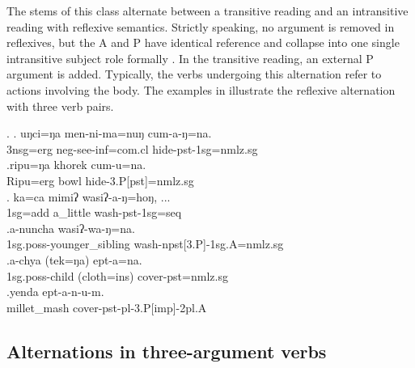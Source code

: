 The stems of this class alternate between a transitive reading and an intransitive reading with reflexive semantics. Strictly speaking, no argument is removed in reflexives, but the A and P have identical reference and collapse into one single intransitive subject role formally \citep[1134]{Haspelmath2004_Valency}. In the transitive reading, an external P argument is added. Typically, the verbs undergoing this alternation refer to actions involving the body. The examples in \Next  illustrate the reflexive alternation with three verb pairs. 

\ex. \ag. uŋci=ŋa men-ni-ma=nuŋ cum-a-ŋ=na.\\
	 {\sc 3nsg=erg} {\sc neg-}see{\sc -inf=com.cl} hide{\sc -pst-1sg=nmlz.sg}\\
 	\bg.ripu=ŋa khorek cum-u=na.\\ 
	Ripu{\sc =erg} bowl hide{\sc -3.P[pst]=nmlz.sg}		\\
	\bg.            ka=ca         mimiʔ   wasiʔ-a-ŋ=hoŋ, ...\\
	{\sc 1sg=add} a\_little wash{\sc -pst-1sg=seq}\\
	  
	 \bg.a-nuncha wasiʔ-wa-ŋ=na.\\ 
	{\sc 1sg.poss-}younger\_sibling wash{\sc -npst[3.P]-1sg.A=nmlz.sg}\\ 
\bg.a-chya (tek=ŋa) ept-a=na.\\
	{\sc 1sg.poss-}child (cloth{\sc =ins}) cover{\sc [3sg]-pst=nmlz.sg}\\
\bg.yenda ept-a-n-u-m.\\
millet\_mash cover{\sc -pst-pl-3.P[imp]-2pl.A}\\


\subsection{Alternations in three-argument verbs}\label{three-arg}

